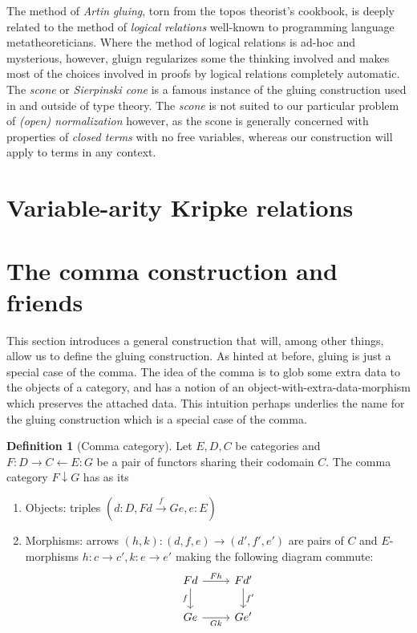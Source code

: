 \documentclass[12pt,twoside]{reedthesis}
\theoremstyle{definition}
\newtheorem{definition}{Definition}
\theoremstyle{remark}
\theoremstyle{plain}
\begin{document}
The method of \emph{Artin gluing}, torn from the topos theorist's cookbook, is
deeply related to the method of \emph{logical relations} well-known to
programming language metatheoreticians. Where the method of logical relations is
ad-hoc and mysterious, however, gluign regularizes some the thinking involved
and makes most of the choices involved in proofs by logical relations completely
automatic. The \emph{scone} or \emph{Sierpinski cone} is a famous instance of
the gluing construction used in and outside of type theory. The \emph{scone} is
not suited to our particular problem of \emph{(open) normalization} however, as
the scone is generally concerned with properties of \emph{closed terms} with no
free variables, whereas our construction will apply to terms in any context.

\section{Variable-arity Kripke relations}

\section{The comma construction and friends}
This section introduces a general construction that will, among other things,
allow us to define the gluing construction. As hinted at before, gluing is just
a special case of the comma. The idea of the comma is to glob some extra data to
the objects of a category, and has a notion of an
object-with-extra-data-morphism which preserves the attached data. This
intuition perhaps underlies the name for the gluing construction which is a
special case of the comma.

\begin{definition}[Comma category]
  Let $E,D,C$ be categories and $F: D \rightarrow C \leftarrow E : G$ be a pair of functors sharing
  their codomain $C$. The comma category \( F \downarrow G \) has as its
  \begin{enumerate}
    \item Objects: triples \( (d : D, Fd \xrightarrow{f} Ge, e : E) \)
    \item Morphisms: arrows $(h,k) : (d, f, e) \rightarrow (d', f', e')$ are pairs of
          $C$ and $E$-morphisms \(h : c \rightarrow c', k : e \rightarrow e'\) making the following
          diagram commute:
          \[
            \begin{tikzcd}
              Fd \arrow{r}{Fh} \arrow{d}[swap]{f} & Fd' \arrow{d}{f'} \\
              Ge \arrow{r}[swap]{Gk} & Ge'\\
            \end{tikzcd}
          \]
  \end{enumerate}
\end{definition}
\end{document}
